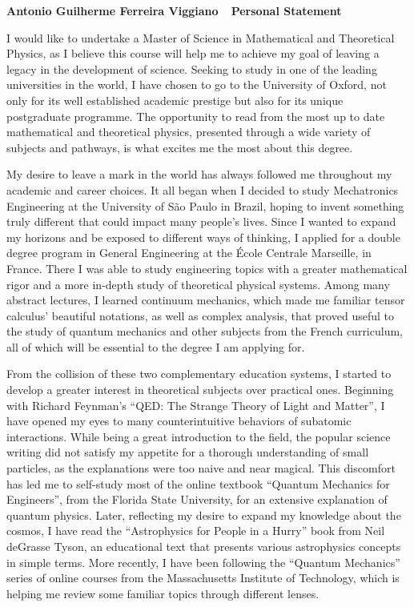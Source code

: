 \documentclass[10pt]{article}
\def\firstname{Antonio Guilherme }
\def\familyname{Ferreira Viggiano}
\def\FileTitle{\firstname\familyname~\textemdash~Personal Statement}
\newcommand*{\NEWLINE}{\vspace{0.75em}}
\begin{document}
\sffamily %

{\bfseries \FileTitle}
\NEWLINE{}

I would like to undertake a Master of Science in Mathematical and Theoretical Physics, as I believe this course will help me to achieve my goal of leaving a legacy in the development of science. Seeking to study in one of the leading universities in the world, I have chosen to go to the University of Oxford, not only for its well established academic prestige but also for its unique postgraduate programme. The opportunity to read from the most up to date mathematical and theoretical physics, presented through a wide variety of subjects and pathways, is what excites me the most about this degree. \NEWLINE{}

My desire to leave a mark in the world has always followed me throughout my academic and career choices. It all began when I decided to study Mechatronics Engineering at the University of São Paulo in Brazil, hoping to invent something truly different that could impact many people's lives. Since I wanted to expand my horizons and be exposed to different ways of thinking, I applied for a double degree program in General Engineering at the École Centrale Marseille, in France. There I was able to study engineering topics with a greater mathematical rigor and a more in-depth study of theoretical physical systems. Among many abstract lectures, I learned continuum mechanics, which made me familiar tensor calculus' beautiful notations, as well as complex analysis, that proved useful to the study of quantum mechanics and other subjects from the French curriculum, all of which will be essential to the degree I am applying for. \NEWLINE{}

From the collision of these two complementary education systems, I started to develop a greater interest in theoretical subjects over practical ones. Beginning with Richard Feynman's ``QED: The Strange Theory of Light and Matter'', I have opened my eyes to many counterintuitive behaviors of subatomic interactions. While being a great introduction to the field, the popular science writing did not satisfy my appetite for a thorough understanding of small particles, as the explanations were too naive and near magical. This discomfort has led me to self-study most of the online textbook ``Quantum Mechanics for Engineers'', from the Florida State University, for an extensive explanation of quantum physics. Later, reflecting my desire to expand my knowledge about the cosmos, I have read the ``Astrophysics for People in a Hurry'' book from Neil deGrasse Tyson, an educational text that presents various astrophysics concepts in simple terms. More recently, I have been following the ``Quantum Mechanics'' series of online courses from the Massachusetts Institute of Technology, which is helping me review some familiar topics through different lenses.
\NEWLINE{}
\end{document}
